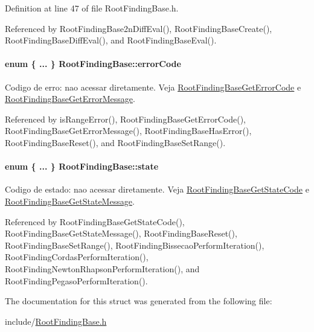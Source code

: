 Definition at line 47 of file RootFindingBase.h.

Referenced by RootFindingBase2nDiffEval(), RootFindingBaseCreate(), RootFindingBaseDiffEval(), and RootFindingBaseEval().\hypertarget{structRootFindingBase_13f6ee23dba551f211ec37015f58c402}{
\paragraph[errorCode]{\setlength{\rightskip}{0pt plus 5cm}enum \{ ... \}   {\bf RootFindingBase::errorCode}}\hfill}
\label{structRootFindingBase_13f6ee23dba551f211ec37015f58c402}


Codigo de erro: nao acessar diretamente. Veja \hyperlink{group____roots_gbcf354e731e02c63652af3a2058e739d}{RootFindingBaseGetErrorCode} e \hyperlink{group____roots_gcc5a0a8948e4b02a878f8d534c0bc982}{RootFindingBaseGetErrorMessage}. 



Referenced by isRangeError(), RootFindingBaseGetErrorCode(), RootFindingBaseGetErrorMessage(), RootFindingBaseHasError(), RootFindingBaseReset(), and RootFindingBaseSetRange().\hypertarget{structRootFindingBase_96362edd623556cf5a0e873c03f72086}{
\paragraph[state]{\setlength{\rightskip}{0pt plus 5cm}enum \{ ... \}   {\bf RootFindingBase::state}}\hfill}
\label{structRootFindingBase_96362edd623556cf5a0e873c03f72086}


Codigo de estado: nao acessar diretamente. Veja \hyperlink{group____roots_g1712b9a29b6e6b15df2195319d5f5d70}{RootFindingBaseGetStateCode} e \hyperlink{group____roots_ga2434bfeb9592ff54df8601cd1a9a04d}{RootFindingBaseGetStateMessage}. 



Referenced by RootFindingBaseGetStateCode(), RootFindingBaseGetStateMessage(), RootFindingBaseReset(), RootFindingBaseSetRange(), RootFindingBissecaoPerformIteration(), RootFindingCordasPerformIteration(), RootFindingNewtonRhapsonPerformIteration(), and RootFindingPegasoPerformIteration().

The documentation for this struct was generated from the following file:\begin{CompactItemize}
\item 
include/\hyperlink{RootFindingBase_8h}{RootFindingBase.h}\end{CompactItemize}
